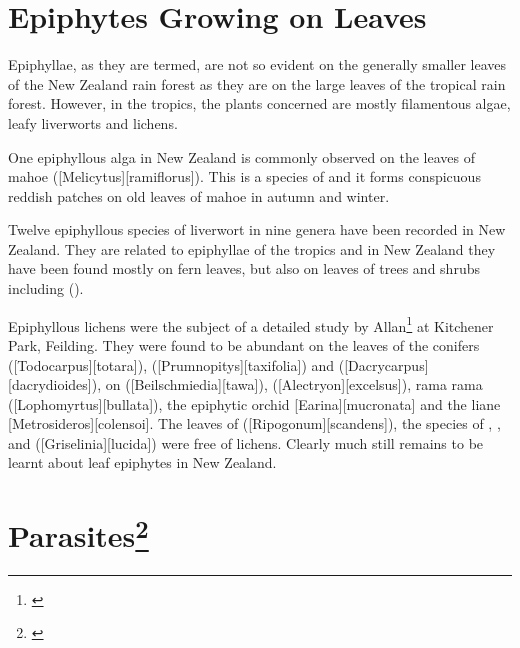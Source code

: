 \section{Epiphytes Growing on Leaves}

Epiphyllae, as they are termed, are not so evident on the generally smaller leaves of the New Zealand rain forest as they are on the large leaves of the tropical rain forest.
However, in the tropics, the plants concerned are mostly filamentous algae, leafy liverworts and lichens.

One epiphyllous alga in New Zealand is commonly observed on the leaves of mahoe ([Melicytus][ramiflorus]).
This is a species of  and it forms conspicuous reddish patches on old leaves of mahoe in autumn and winter.

Twelve epiphyllous species of liverwort in nine genera have been recorded in New Zealand.
They are related to epiphyllae of the tropics and in New Zealand they have been found mostly on fern leaves, but also on leaves of trees and shrubs including  ().

Epiphyllous lichens were the subject of a detailed study by Allan\footnote{\cite{zahlbruckner1928epiphyllous}} at Kitchener Park, Feilding.
They were found to be abundant on the leaves of the conifers  ([Todocarpus][totara]),  ([Prumnopitys][taxifolia]) and  ([Dacrycarpus][dacrydioides]), on  ([Beilschmiedia][tawa]),  ([Alectryon][excelsus]), rama rama ([Lophomyrtus][bullata]), the epiphytic orchid [Earina][mucronata] and the liane [Metrosideros][colensoi].
The leaves of  ([Ripogonum][scandens]), the species of , ,  and  ([Griselinia][lucida]) were free of lichens.
Clearly much still remains to be learnt about leaf epiphytes in New Zealand.

\section[Parasites]{Parasites\thinspace\footnote{\cite{fineran1974parasitic}}}

